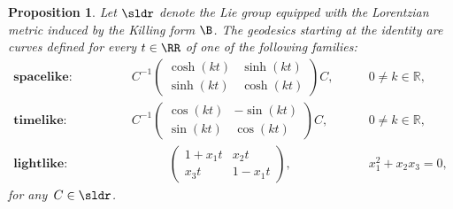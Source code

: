 \documentclass[11pt]{amsart}
\theoremstyle{plain}
\newtheorem{prop}[thm]{Proposition}
\theoremstyle{definition}
\theoremstyle{remark}
\begin{document}

\begin{prop}\label{sl2r} Let $\sldr$ denote the Lie group equipped with the Lorentzian metric  induced by the  Killing form $\B$. The geodesics starting at the identity 
	are curves  defined for every $t\in \RR$ of one of  the following  families:
\begin{eqnarray*}\label{equ1}
\textbf{spacelike}: \qquad \qquad &  C^{-1} \left( \begin{array}{ccc}
\cosh(k t) & \sinh(kt) \\ 
\sinh(kt) & \cosh(kt) \end{array} \right) C,  \qquad & 0 \neq k \in \mathbb{R},\\
\textbf{timelike}:  \qquad \qquad & C^{-1} \left( \begin{array}{ccc}
\cos(k t) & -\sin(kt) \\ 
\sin(kt) & \cos(kt) \end{array} \right) C,  \qquad   & 0 \neq k \in \mathbb{R},\\
\textbf{lightlike:}  \qquad \qquad &  \qquad \quad \left( \begin{array}{ccc}
1+x_1 t & x_2t \\
x_3t & 1-x_1t \end{array} \right),  \qquad \qquad & x_1^2+x_2x_3 = 0,
\end{eqnarray*}
for any $ \, C \in \sldr$. \end{prop}
\end{document}
